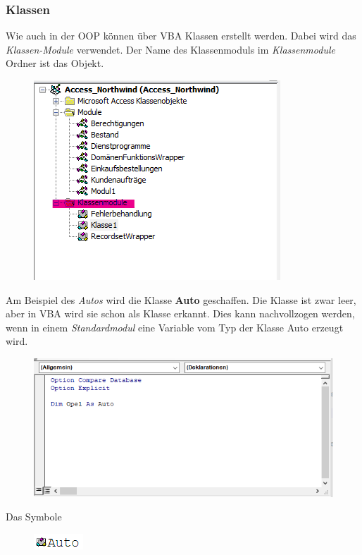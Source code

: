 \subsubsection{Klassen}
Wie auch in der \gls{OOP} können über \gls{VBA} Klassen erstellt werden. Dabei wird das \textit{Klassen-Module} verwendet. Der Name des Klassenmoduls im \textit{Klassenmodule} Ordner ist das Objekt.
\begin{figure}[H]
	\centering
	\includegraphics[scale = 0.3]{attachment/chapter_2/Scc027}
	\caption{}
	\label{fig:Scc027}
\end{figure} 
Am Beispiel des \textit{Autos} wird die Klasse \textbf{Auto} geschaffen. Die Klasse ist zwar leer, aber in \gls{VBA} wird sie schon als Klasse erkannt. Dies kann nachvollzogen werden, wenn in einem \textit{Standardmodul} eine Variable vom Typ der Klasse Auto erzeugt wird.
\begin{figure}[H]
	\centering
	\includegraphics[scale = 0.6]{attachment/chapter_2/Scc028}
	\caption{}
	\label{fig:Scc028}
\end{figure} 
Das Symbole
\begin{figure}[H]
	\centering
	\includegraphics[scale = 1.3]{attachment/chapter_2/Scc029}
	\caption{}
	\label{fig:Scc029}
\end{figure} 
